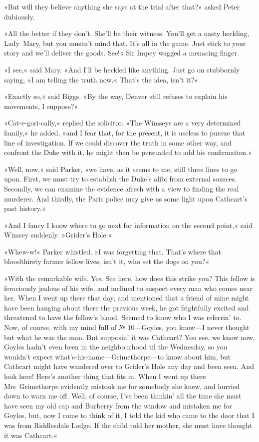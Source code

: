 »But will they believe anything she says at the trial after that?« asked Peter dubiously.

»All the better if they don't. She'll be their witness. You'll get a nasty heckling, Lady~Mary, but you mustn't mind that. It's all in the game. Just stick to your story and we'll deliver the goods. See!« Sir Impey wagged a menacing finger.

»I see,« said Mary. »And I'll be heckled like anything. Just go on stubbornly saying, »I am telling the truth now.« That's the idea, isn't it?«

»Exactly so,« said Biggs. »By the way, Denver still refuses to explain his movements, I suppose?«

»Cat-e-gori-cally,« replied the solicitor. »The Wimseys are a very determined family,« he added, »and I fear that, for the present, it is useless to pursue that line of investigation. If we could discover the truth in some other way, and confront the Duke with it, he might then be persuaded to add his confirmation.«

»Well, now,« said Parker, »we have, as it seems to me, still three lines to go upon. First, we must try to establish the Duke's alibi from external sources. Secondly, we can examine the evidence afresh with a view to finding the real murderer. And thirdly, the Paris police may give us some light upon Cathcart's past history.«

»And I fancy I know where to go next for information on the second point,« said Wimsey suddenly. »Grider's Hole.«

»Whew-w!« Parker whistled. »I was forgetting that. That's where that bloodthirsty farmer fellow lives, isn't it, who set the dogs on you?«

»With the remarkable wife. Yes. See here, how does this strike you?  This fellow is ferociously jealous of his wife, and inclined to suspect every man who comes near her. When I went up there that day, and mentioned that a friend of mine might have been hanging about there the previous week, he got frightfully excited and threatened to have the fellow's blood. Seemed to know who I was referrin' to. Now, of course, with my mind full of № 10—Goyles, you know—I never thought but what he was the man. But supposin' it was Cathcart? You see, we know now, Goyles hadn't even been in the neighbourhood til the Wednesday, so you wouldn't expect what's-his-name—Grimethorpe—to know about him, but Cathcart might have wandered over to Grider's Hole any day and been seen. And look here! Here's another thing that fits in. When I went up there Mrs~Grimethorpe evidently mistook me for somebody she knew, and hurried down to warn me off. Well, of course, I've been thinkin' all the time she must have seen my old cap and Burberry from the window and mistaken me for Goyles, but, now I come to think of it, I told the kid who came to the door that I was from Riddlesdale Lodge. If the child told her mother, she must have thought it was Cathcart.«

